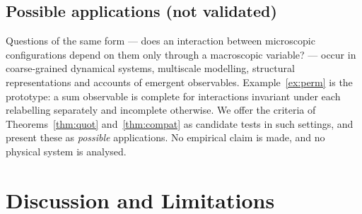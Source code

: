 \documentclass[11pt,a4paper]{article}
\theoremstyle{plain}
\theoremstyle{definition}
\begin{document}
\subsection{Possible applications (not validated)}
Questions of the same form --- does an interaction between microscopic configurations depend on them only through a macroscopic variable? --- occur in coarse-grained dynamical systems, multiscale modelling, structural representations and accounts of emergent observables. Example~\ref{ex:perm} is the prototype: a sum observable is complete for interactions invariant under each relabelling separately and incomplete otherwise. We offer the criteria of Theorems~\ref{thm:quot} and~\ref{thm:compat} as candidate tests in such settings, and present these as \emph{possible} applications. No empirical claim is made, and no physical system is analysed.

\section{Discussion and Limitations}\label{sec:discussion}
\end{document}
